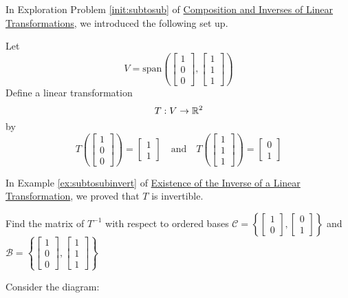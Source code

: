 \documentclass{ximera}
\begin{document}
\begin{example}\label{ex:inversematrixoftransform}
In Exploration Problem \ref{init:subtosub} of \href{https://ximera.osu.edu/oerlinalg/LinearAlgebra/LTR-0030/main}{Composition and Inverses of Linear Transformations}, we introduced the following set up.

Let $$V=\text{span}\left(\begin{bmatrix}1\\0\\0\end{bmatrix}, \begin{bmatrix}1\\1\\1\end{bmatrix}\right)$$
Define a linear transformation $$T:V\rightarrow \mathbb{R}^2$$
by $$T\left(\begin{bmatrix}1\\0\\0\end{bmatrix}\right)=\begin{bmatrix}1\\1\end{bmatrix}\quad \text{and} \quad T\left(\begin{bmatrix}1\\1\\1\end{bmatrix}\right)=\begin{bmatrix}0\\1\end{bmatrix}$$

In Example \ref{ex:subtosubinvert} of \href{https://ximera.osu.edu/oerlinalg/LinearAlgebra/LTR-0035/main}{Existence of the Inverse of a Linear Transformation}, we proved that $T$ is invertible.  

Find the matrix of $T^{-1}$ with respect to ordered bases $\mathcal{C}=\left\{\begin{bmatrix}1\\0\end{bmatrix},\begin{bmatrix}0\\1\end{bmatrix}\right\}$ and $\mathcal{B}=\left\{\begin{bmatrix}1\\0\\0\end{bmatrix}, \begin{bmatrix}1\\1\\1\end{bmatrix}\right\}$
\begin{explanation}
Consider the diagram:
\begin{center}
\end{center}
\end{explanation}
\end{example}
\end{document}
